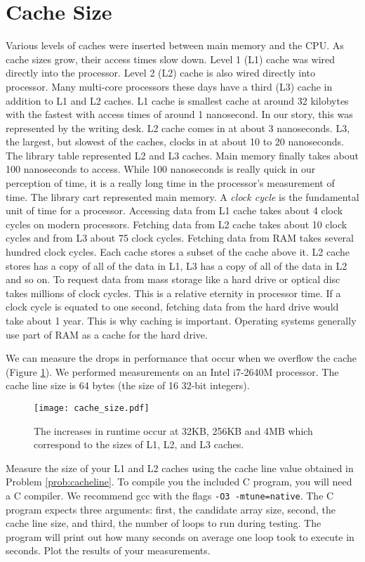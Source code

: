 \section*{Cache Size}
Various levels of caches were inserted between main memory and the CPU.
As cache sizes grow, their access times slow down.
Level 1 (L1) cache was wired directly into the processor.  Level 2 (L2) cache is also wired directly into processor.
Many multi-core processors these days have a third (L3) cache in addition to L1 and L2 caches.
L1 cache is smallest cache at around 32 kilobytes with the fastest with access times of around 1 nanosecond.
In our story, this was represented by the writing desk.
L2 cache comes in at about 3 nanoseconds.  L3, the largest, but slowest of the caches, clocks in at about 10 to 20 nanoseconds.
The library table represented L2 and L3 caches.
Main memory finally takes about 100 nanoseconds to access.  While 100 nanoseconds is really quick in our perception of time, it is a really long time in the processor's measurement of time.
The library cart represented main memory.
A \emph{clock cycle} is the fundamental unit of time for a processor.
Accessing data from L1 cache takes about 4 clock cycles on modern processors.  Fetching data from L2 cache takes about 10 clock cycles and from L3 about 75 clock cycles.
Fetching data from RAM takes several hundred clock cycles.
Each cache stores a subset of the cache above it.  L2 cache stores has a copy of all of the data in L1, L3 has a copy of all of the data in L2 and so on.
To request data from mass storage like a hard drive or optical disc takes millions of clock cycles.  This is a relative eternity in processor time.
If a clock cycle is equated to one second, fetching data from the hard drive would take about 1 year.
This is why caching is important.  Operating systems generally use part of RAM as a cache for the hard drive.

We can measure the drops in performance that occur when we overflow the cache (Figure \ref{fig:cachesizes}).
We performed measurements on an Intel i7-2640M processor.  The cache line size is 64 bytes (the size of 16 32-bit integers).
\begin{figure}[h]
\centering
\texttt{[image: cache\_size.pdf]}
\caption{The increases in runtime occur at 32KB, 256KB and 4MB which correspond to the sizes of L1, L2, and L3 caches.}
\label{fig:cachesizes}
\end{figure}

\begin{problem}
Measure the size of your L1 and L2 caches using the cache line value obtained in
Problem \ref{prob:cacheline}.
To compile you the included C program, you will need a C compiler.
We recommend gcc with the flags \texttt{-O3 -mtune=native}.
The C program expects three arguments: first, the candidate array size, second, the cache line size, and third, the number of loops to run during testing.
The program will print out how many seconds on average one loop took to execute in seconds.
Plot the results of your measurements.
\end{problem}

